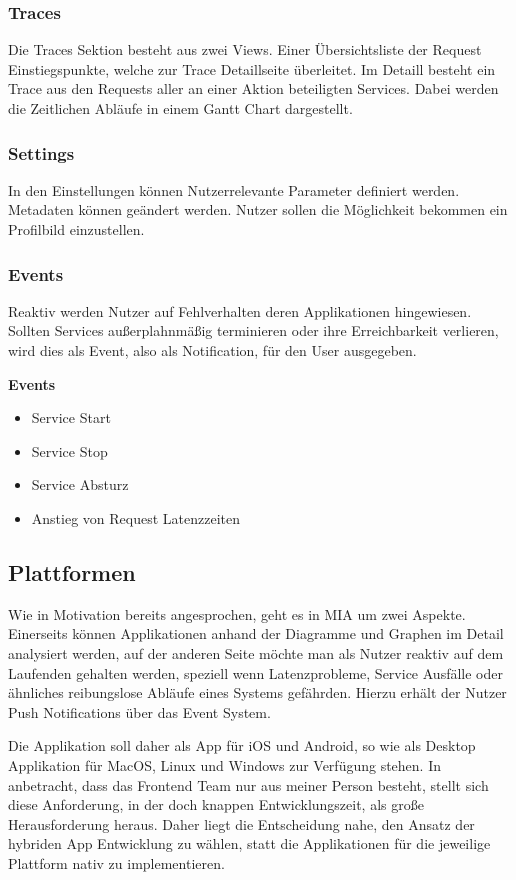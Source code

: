 \subsubsection{Traces}

Die Traces Sektion besteht aus zwei Views. Einer Übersichtsliste der Request Einstiegspunkte,
welche zur Trace Detaillseite überleitet. Im Detaill besteht ein Trace aus den Requests
aller an einer Aktion beteiligten Services. Dabei werden die Zeitlichen Abläufe in einem Gantt Chart dargestellt.

\subsubsection{Settings}

In den Einstellungen können Nutzerrelevante Parameter definiert werden. Metadaten können geändert werden.
Nutzer sollen die Möglichkeit bekommen ein Profilbild einzustellen.

\subsubsection{Events}

Reaktiv werden Nutzer auf Fehlverhalten deren Applikationen hingewiesen. Sollten Services außerplahnmäßig terminieren oder ihre Erreichbarkeit verlieren,
wird dies als Event, also als Notification, für den User ausgegeben.

\vspace{1cm}
\textbf{Events}
\begin{itemize}
\item Service Start
\item Service Stop
\item Service Absturz
\item Anstieg von Request Latenzzeiten
\end{itemize}
\vspace{1cm}


\subsection{Plattformen}

Wie in Motivation bereits angesprochen, geht es in MIA um zwei Aspekte. Einerseits können Applikationen anhand der Diagramme und Graphen im Detail analysiert werden,
auf der anderen Seite möchte man als Nutzer reaktiv auf dem Laufenden gehalten werden, speziell wenn Latenzprobleme, Service Ausfälle oder ähnliches reibungslose Abläufe eines Systems gefährden.
Hierzu erhält der Nutzer Push Notifications über das Event System.

Die Applikation soll daher als App für iOS und Android, so wie als Desktop Applikation für MacOS, Linux und Windows zur Verfügung stehen.
In anbetracht, dass das Frontend Team nur aus meiner Person besteht, stellt sich diese Anforderung, in der doch knappen Entwicklungszeit, als große Herausforderung heraus.
Daher liegt die Entscheidung nahe, den Ansatz der hybriden App Entwicklung zu wählen, statt die Applikationen für die jeweilige Plattform nativ zu implementieren.
